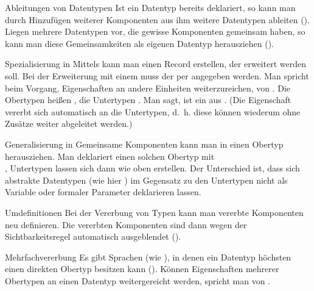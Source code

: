 \begin{Def}{Ableitungen von Datentypen}
    Ist ein Datentyp bereits deklariert, so kann man durch Hinzufügen weiterer
    Komponenten aus ihm weitere Datentypen ableiten
    (). \\
    Liegen mehrere Datentypen vor, die gewisse Komponenten gemeinsam haben, so
    kann man diese Gemeinsamkeiten als eigenen Datentyp herausziehen
    ().
\end{Def}

\begin{Def}{Spezialisierung in \Ada{}}
    Mittels  kann man einen
    Record erstellen, der erweitert werden soll.
    Bei der Erweiterung mit einem  muss der
     per
     angegeben werden.
    Man spricht beim Vorgang, Eigenschaften an andere Einheiten
    weiterzureichen, von .
    Die Obertypen heißen , die Untertypen .
    Man sagt,  ist ein aus 
    .
    (Die Eigenschaft  vererbt sich automatisch an die
    Untertypen, d.~h. diese können wiederum ohne Zusätze weiter abgeleitet
    werden.)
\end{Def}

\begin{Def}{Generalisierung in \Ada{}}
    Gemeinsame Komponenten kann man in einen Obertyp herausziehen.
    Man deklariert einen solchen Obertyp mit \\
    ,
    Untertypen lassen sich dann wie oben erstellen.
    Der Unterschied ist, dass sich abstrakte Datentypen (wie hier
    ) im Gegensatz zu den Untertypen nicht als Variable oder
    formaler Parameter deklarieren lassen.
\end{Def}

\begin{Def}{Umdefinitionen}
    Bei der Vererbung von Typen kann man vererbte Komponenten neu definieren.
    Die vererbten Komponenten sind dann wegen der Sichtbarkeitsregel
    automatisch ausgeblendet ().
\end{Def}

\begin{Def}{Mehrfachvererbung}
    Es gibt Sprachen (wie \Ada{}), in denen ein Datentyp höchsten einen
    direkten Obertyp besitzen kann ().
    Können Eigenschaften mehrerer Obertypen an einen Datentyp weitergereicht
    werden, spricht man von .
\end{Def}

